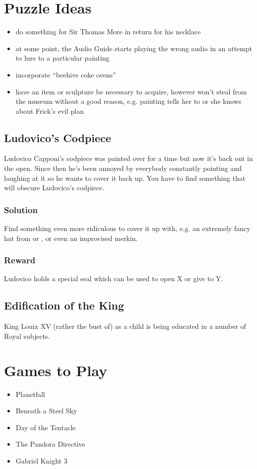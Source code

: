 \documentclass{article}
\begin{document}
\section{Puzzle Ideas}
\begin{itemize}
  \item do something for Sir Thomas More in return for his necklace
  \item at some point, the Audio Guide starts playing the wrong audio in an attempt to lure \cyl{} to a particular painting
  \item incorporate ``beehive coke ovens''
  \item have an item or sculpture be necessary to acquire, however \cyl{} won't steal from the museum without a good reason, e.g. painting tells her to or she knows about Frick's evil plan
\end{itemize}
\subsection{Ludovico's Codpiece}
Ludovico Capponi's codpiece was painted over for a time but now it's back out in the open. Since then he's been annoyed by everybody constantly pointing and laughing at it so he wants to cover it back up. You have to find something that will obscure Ludovico's codpiece.
\subsubsection{Solution}
Find something even more ridiculous to cover it up with, e.g. an extremely fancy hat from \pskipworth{} or \petaylor{}, or even an improvised merkin.
\subsubsection{Reward}
Ludovico holds a special seal which can be used to open X or give to Y.
\subsection{Edification of the King}
King Louix XV (rather the bust of) as a child is being educated in a number of Royal subjects.
\section{Games to Play}
\begin{itemize}
  \item Planetfall
  \item Beneath a Steel Sky
  \item Day of the Tentacle
  \item The Pandora Directive
  \item Gabriel Knight 3
\end{itemize}
\end{document}
